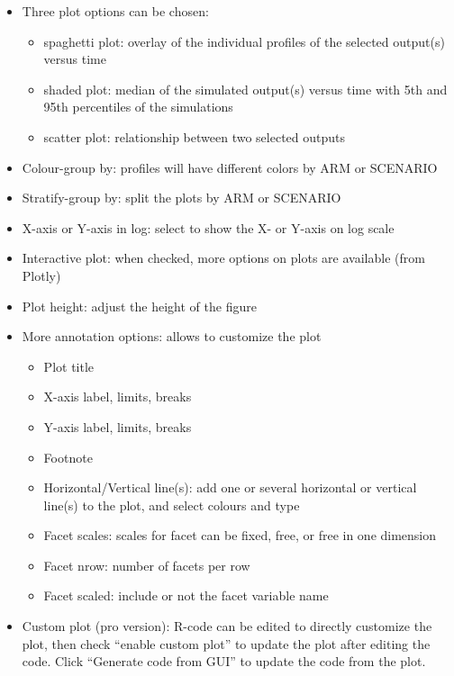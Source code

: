 \documentclass[
]{book}
\providecommand{\tightlist}{%
  \setlength{\itemsep}{0pt}\setlength{\parskip}{0pt}}
\begin{document}
\begin{itemize}
\item
  Three plot options can be chosen:

  \begin{itemize}
  \tightlist
  \item
    spaghetti plot: overlay of the individual profiles of the selected output(s) versus time
  \item
    shaded plot: median of the simulated output(s) versus time with 5th and 95th percentiles of the simulations
  \item
    scatter plot: relationship between two selected outputs
  \end{itemize}
\item
  Colour-group by: profiles will have different colors by ARM or SCENARIO
\item
  Stratify-group by: split the plots by ARM or SCENARIO
\item
  X-axis or Y-axis in log: select to show the X- or Y-axis on log scale
\item
  Interactive plot: when checked, more options on plots are available (from Plotly)
\item
  Plot height: adjust the height of the figure
\item
  More annotation options: allows to customize the plot

  \begin{itemize}
  \tightlist
  \item
    Plot title
  \item
    X-axis label, limits, breaks
  \item
    Y-axis label, limits, breaks
  \item
    Footnote
  \item
    Horizontal/Vertical line(s): add one or several horizontal or vertical line(s) to the plot, and select colours and type
  \item
    Facet scales: scales for facet can be fixed, free, or free in one dimension
  \item
    Facet nrow: number of facets per row
  \item
    Facet scaled: include or not the facet variable name
  \end{itemize}
\item
  Custom plot (pro version): R-code can be edited to directly customize the plot, then check ``enable custom plot'' to update the plot after editing the code. Click ``Generate code from GUI'' to update the code from the plot.
\end{itemize}
\end{document}
